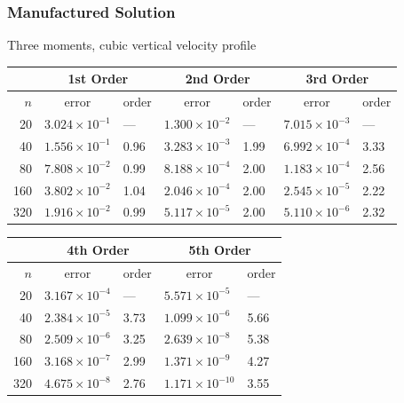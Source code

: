 \documentclass[10pt]{beamer}
\begin{document}
    \begin{frame}
        \frametitle{Manufactured Solution}
        Three moments, cubic vertical velocity profile
        \footnotesize
        \begin{table}
          \centering
          \begin{tabular}{r*{6}l}
            \toprule
            & \multicolumn{2}{c}{1st Order} & \multicolumn{2}{c}{2nd Order} & \multicolumn{2}{c}{3rd Order} \\
            \midrule
            \(n\) & \multicolumn{1}{c}{error} & order & \multicolumn{1}{c}{error} & order & \multicolumn{1}{c}{error} & order\\
            \midrule
             20 & \( 3.024 \times 10^{-1} \) &  --- & \( 1.300 \times 10^{-2} \) &  --- & \( 7.015 \times 10^{-3} \) &  --- \\
             40 & \( 1.556 \times 10^{-1} \) & 0.96 & \( 3.283 \times 10^{-3} \) & 1.99 & \( 6.992 \times 10^{-4} \) & 3.33 \\
             80 & \( 7.808 \times 10^{-2} \) & 0.99 & \( 8.188 \times 10^{-4} \) & 2.00 & \( 1.183 \times 10^{-4} \) & 2.56 \\
            160 & \( 3.802 \times 10^{-2} \) & 1.04 & \( 2.046 \times 10^{-4} \) & 2.00 & \( 2.545 \times 10^{-5} \) & 2.22 \\
            320 & \( 1.916 \times 10^{-2} \) & 0.99 & \( 5.117 \times 10^{-5} \) & 2.00 & \( 5.110 \times 10^{-6} \) & 2.32 \\
            \bottomrule
          \end{tabular}
        \end{table}
        \begin{table}
          \centering
          \begin{tabular}{r*{4}l}
            \toprule
            & \multicolumn{2}{c}{4th Order} & \multicolumn{2}{c}{5th Order} \\
            \midrule
            \(n\) & \multicolumn{1}{c}{error} & order & \multicolumn{1}{c}{error} & order \\
            \midrule
             20 & \( 3.167 \times 10^{ -4} \) &  --- & \( 5.571 \times 10^{ -5} \) &  --- \\
             40 & \( 2.384 \times 10^{ -5} \) & 3.73 & \( 1.099 \times 10^{ -6} \) & 5.66 \\
             80 & \( 2.509 \times 10^{ -6} \) & 3.25 & \( 2.639 \times 10^{ -8} \) & 5.38 \\
            160 & \( 3.168 \times 10^{ -7} \) & 2.99 & \( 1.371 \times 10^{ -9} \) & 4.27 \\
            320 & \( 4.675 \times 10^{ -8} \) & 2.76 & \( 1.171 \times 10^{-10} \) & 3.55 \\
            \bottomrule
          \end{tabular}
        \end{table}
    \end{frame}
\end{document}
